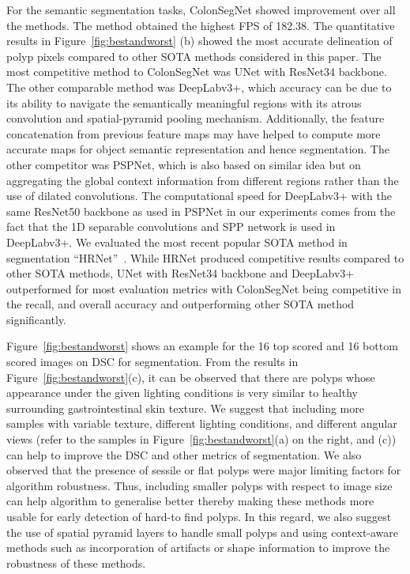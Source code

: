 \documentclass[journal]{IEEEtran}
\begin{document}
For the semantic segmentation tasks, ColonSegNet showed improvement over all the methods. The method obtained the highest FPS of 182.38. The quantitative results in Figure~\ref{fig:bestandworst} (b) showed the most accurate delineation of polyp pixels compared to other SOTA methods considered in this paper. The most competitive method to ColonSegNet was UNet with ResNet34 backbone. The other comparable method was DeepLabv3+, which accuracy can be due to its ability to navigate the semantically meaningful regions with its atrous convolution and spatial-pyramid pooling mechanism. Additionally, the feature concatenation from previous feature maps may have helped to compute more accurate maps for object semantic representation and hence segmentation. The other competitor was PSPNet, which is also based on similar idea but on aggregating the global context information from different regions rather than the use of dilated convolutions. The computational speed for DeepLabv3+ with the same ResNet50 backbone as used in PSPNet in our experiments comes from the fact that the 1D separable convolutions and SPP network is used in DeepLabv3+. We evaluated the most recent popular SOTA method in segmentation ``HRNet''~\cite{wang2020deep}. While HRNet produced competitive results compared to other SOTA methods, UNet with ResNet34 backbone and DeepLabv3+ outperformed for most evaluation metrics with ColonSegNet being competitive in the recall, and overall accuracy and outperforming other SOTA method significantly. 

Figure~\ref{fig:bestandworst} shows an example for the 16 top scored and 16 bottom scored images on \ac{DSC} for segmentation. From the results in Figure~\ref{fig:bestandworst}(c), it can be observed  that there are polyps whose appearance under the given lighting conditions is very similar to healthy surrounding gastrointestinal skin texture. We suggest that including more samples with variable texture, different lighting conditions, and different angular views (refer to the samples in Figure~\ref{fig:bestandworst}(a) on the right, and (c)) can help to improve the \ac{DSC} and other metrics of segmentation. We also observed  that the presence of sessile or flat polyps were major limiting factors for algorithm robustness. Thus, including smaller polyps with respect to image size can help algorithm to generalise better thereby making these methods more usable for early detection of hard-to find polyps. In this regard, we also suggest the use of spatial pyramid layers to handle small polyps and using context-aware methods such as incorporation of artifacts or shape information to improve the robustness of these methods.
\end{document}

